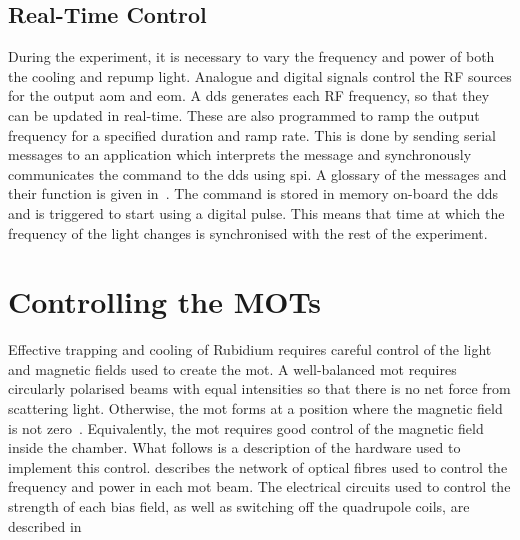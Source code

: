 \subsection{Real-Time Control} \label{subsec:muquans_comm}
During the experiment, it is necessary to vary the frequency and power
of both
the cooling and repump light.
Analogue and digital signals control the RF sources for the output
\ac{aom} and
\ac{eom}. A \ac{dds} generates each RF frequency, so that they can be
updated in real-time.
These are also
programmed to ramp the output frequency for a specified duration and
ramp rate. This is done by sending serial messages to an
application which interprets the message and synchronously communicates the command to the \ac{dds} using
\ac{spi}. A glossary of the messages and their function is given
in~. The command is stored in memory
on-board the \ac{dds} and
is triggered to start using a digital pulse. This means that time at
which the frequency of the light changes is synchronised with the rest
of the experiment. 
\section{Controlling the MOTs}\label{sec:mot_control} Effective
trapping and cooling of Rubidium requires careful control of the light
and magnetic fields used to create the \ac{mot}. A well-balanced
\ac{mot} requires circularly polarised beams with equal intensities so
that there is no net force from scattering light. Otherwise, the
\ac{mot} forms at a position where the magnetic field is not
zero~\cite{Steane1992}. Equivalently, the \ac{mot} requires good
control of the magnetic field inside the chamber. What follows is a
description of the hardware used to implement this control.
 describes the network of optical
fibres used to control the frequency and power in each \ac{mot} beam.
The electrical circuits used to control the strength of each bias
field, as well as switching off the quadrupole coils, are described
in~ 
